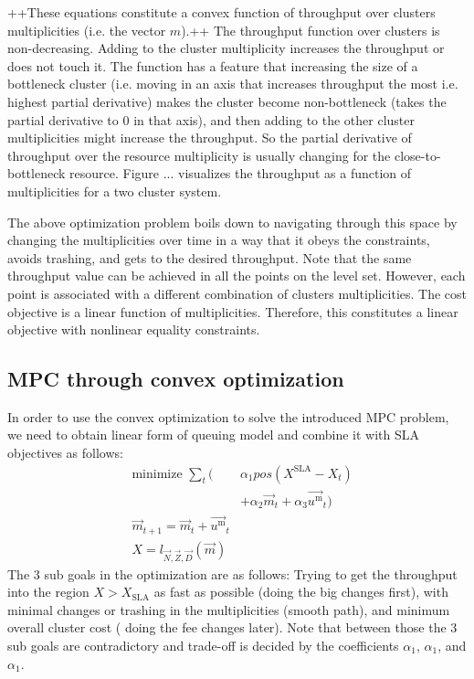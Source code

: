   
 ++These equations constitute a convex function 
 of  throughput over clusters multiplicities (i.e. the vector $m$).++   %
 The throughput function over clusters is non-decreasing. 
  Adding to the cluster multiplicity increases the throughput or does not touch it. 
   The function has a feature that increasing the size of a bottleneck cluster (i.e. moving in an axis that increases throughput the most i.e. highest partial derivative) makes the cluster become non-bottleneck (takes the partial derivative to 0 in that axis), and then adding to the other cluster multiplicities might increase the throughput.  So the partial derivative of throughput over the resource multiplicity is usually changing for the close-to-bottleneck resource.  Figure ...  visualizes the throughput as a function of multiplicities for a two cluster system.  
 
  The above optimization problem boils down to navigating through this space by changing the multiplicities over time in a way that it obeys the constraints, avoids trashing, and gets to the desired throughput. Note that the same throughput value can be achieved in all the points on the level set. However, each point is associated with a different combination of clusters multiplicities. The cost objective is a linear function of multiplicities.  Therefore, this constitutes a linear objective with nonlinear equality constraints.       
     
 \subsection{MPC through convex optimization}  
 In order to use the convex optimization to solve the introduced MPC problem, we need to obtain linear form of queuing model  and combine it with SLA objectives  as follows: 
 \begin{align}  
&  \text{minimize } \sum_t (
 &\alpha_1 pos(X^\text{SLA}-X_t) \nonumber \\
 &&+\alpha_2 \vec{m}_t
  +\alpha_3 \vec{u^\text{m}}_t ) \\
&  \vec{m}_{t+1} = \vec{m}_t + \vec{u^\text{m}}_t \nonumber \\ 
&  X=l_{\vec{N},\vec{Z},\vec{D}}(\vec{m}) \nonumber
 \end{align}
  The 3 sub goals in the optimization are as follows: 
   Trying to get the throughput into the region $X>X_\text{SLA}$ as fast as possible (doing the big changes first), 
   with minimal changes or trashing in the multiplicities (smooth path),  
  and minimum overall cluster cost ( doing the fee changes later).
    Note that between those the 3 sub goals are contradictory and trade-off is decided by the coefficients $\alpha_1$, $\alpha_1$, and $\alpha_1$.  
  

